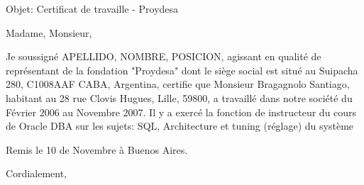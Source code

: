 \documentclass[11pt]{letter} %
\begin{document}

\begin{letter}{} 
\date{}%


\signature{NOMBRE APELLIDO} %


Objet: Certificat de travaille - Proydesa

\opening{Madame, Monsieur,} 

Je soussigné {APELLIDO, NOMBRE}, {POSICION}, agissant en qualité de représentant de la fondation "Proydesa" dont le siège social est situé au Suipacha 280, C1008AAF CABA, Argentina, certifie que Monsieur Bragagnolo Santiago, habitant au 28 rue Clovis Hugues, Lille, 59800, a travaillé dans notre société du Février 2006 au Novembre 2007. Il y a exercé la fonction de instructeur du cours de Oracle DBA sur les sujets: SQL, Architecture et tuning (réglage) du système 


Remis le 10 de Novembre à Buenos Aires. 


\closing{Cordialement,}




\end{letter}
\end{document}
